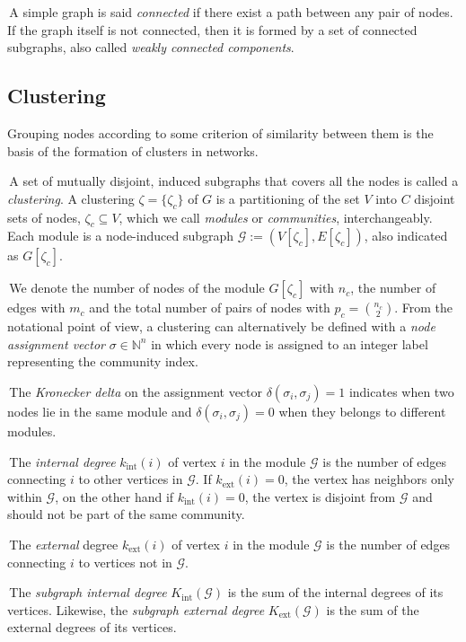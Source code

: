\noindent\textbullet \,A simple graph is said \emph{connected} if there exist a path between any pair of nodes. If the graph itself is not connected, then it is formed by a set of connected subgraphs, also called \emph{weakly connected components}.


\subsection{Clustering}\label{sec:clustering}
Grouping nodes according to some criterion of similarity between them is the basis of the formation of clusters in networks.

\noindent\textbullet \,A set of mutually disjoint, induced subgraphs that covers all the nodes is called a \emph{clustering}.
A clustering $\zeta = \{\zeta_c\}$ of $G$ is a partitioning of the set $V$ into $C$ disjoint sets of nodes, $\zeta_c \subseteq V$, which we call \emph{modules} or \emph{communities}, interchangeably. 
Each module is a node-induced subgraph $\mathcal{G}:=(V[\zeta_c],E[\zeta_c])$, also indicated as $G[\zeta_c]$.

\noindent\textbullet \,We denote the number of nodes of the module $G[\zeta_c]$ with $n_c$, the number of edges with $m_c$ and the total number of pairs of nodes with $p_c=\binom{n_c}{2}$.
From the notational point of view, a clustering can alternatively be defined with a \emph{node assignment vector} $\sigma \in \mathbb{N}^n$ in which every node is assigned to an integer label representing the community index. 

\noindent\textbullet \,The \emph{Kronecker delta} on the assignment vector $\delta(\sigma_i,\sigma_j)=1$ indicates when two nodes lie in the same module and $\delta(\sigma_i,\sigma_j)=0$ when they belongs to different modules.

\noindent\textbullet \,The \emph{internal degree} $k_{\textrm{int}}(i)$ of vertex $i$ in the module $\mathcal{G}$ is the number of edges connecting $i$ to other vertices in $\mathcal{G}$. If $k_{\textrm{ext}}(i)=0$, the vertex has neighbors only within $\mathcal{G}$, on the other hand if $k_{\textrm{int}}(i)=0$, the vertex is disjoint from $\mathcal{G}$ and should not be part of the same community.

\noindent\textbullet \,The \emph{external} degree $k_{\textrm{ext}}(i)$ of vertex $i$ in the module $\mathcal{G}$ is the number of edges connecting $i$ to vertices not in $\mathcal{G}$.

\noindent\textbullet \,The \emph{subgraph internal degree} $K_{\textrm{int}}(\mathcal{G})$ is the sum of the internal degrees of its vertices.
Likewise, the \emph{subgraph external degree} $K_{\textrm{ext}}(\mathcal{G})$ is the sum of the external degrees of its vertices.

